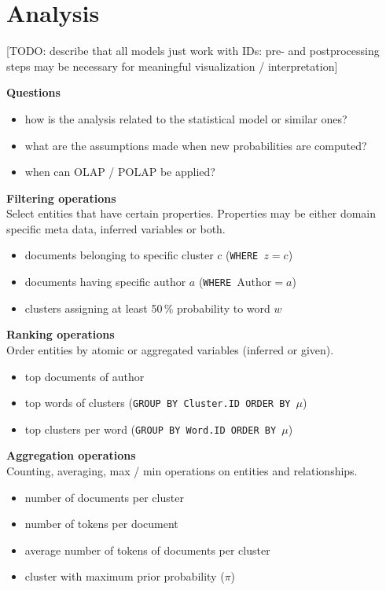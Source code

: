 \section{Analysis}

[TODO: describe that all models just work with IDs: pre- and postprocessing steps may be necessary for meaningful visualization / interpretation]

\textbf{Questions}
\begin{itemize}
\item how is the analysis related to the statistical model or similar ones?
\item what are the assumptions made when new probabilities are computed?
\item when can OLAP / POLAP be applied?
\end{itemize}

\textbf{Filtering operations}\\
Select entities that have certain properties. Properties may be either domain specific meta data, inferred variables or both.
\begin{itemize}
\item documents belonging to specific cluster $c$ (\texttt{WHERE $z = c$})
\item documents having specific author $a$ (\texttt{WHERE $\textrm{Author} = a$})
\item clusters assigning at least 50\,\% probability to word $w$
\end{itemize}

\textbf{Ranking operations}\\
Order entities by atomic or aggregated variables (inferred or given).
\begin{itemize}
\item top documents of author
\item top words of clusters (\texttt{GROUP BY \textrm{Cluster.ID} ORDER BY $\mu$})
\item top clusters per word (\texttt{GROUP BY \textrm{Word.ID} ORDER BY $\mu$})
\end{itemize}

\textbf{Aggregation operations}\\
Counting, averaging, max / min operations on entities and relationships.
\begin{itemize}
\item number of documents per cluster
\item number of tokens per document
\item average number of tokens of documents per cluster
\item cluster with maximum prior probability ($\pi$)
\end{itemize}
